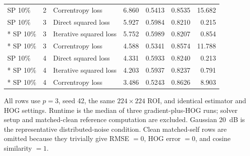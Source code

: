 \begin{longtable}{@{}lr lrrrr@{}}
SP 10\% & 2 & Correntropy loss & 6.860 & 0.5413 & 0.8535 & 15.682 \\
\addlinespace[1.2pt]
SP 10\% & 3 & Direct squared loss & 5.927 & 0.5984 & 0.8210 & 0.215 \\*
SP 10\% & 3 & Iterative squared loss & 5.752 & 0.5989 & 0.8207 & 0.854 \\*
SP 10\% & 3 & Correntropy loss & 4.588 & 0.5341 & 0.8574 & 11.788 \\
\addlinespace[1.2pt]
SP 10\% & 4 & Direct squared loss & 4.331 & 0.5933 & 0.8240 & 0.213 \\*
SP 10\% & 4 & Iterative squared loss & 4.203 & 0.5937 & 0.8237 & 0.791 \\*
SP 10\% & 4 & Correntropy loss & 3.486 & 0.5243 & 0.8626 & 8.903 \\
\end{longtable}
\endgroup
\noindent\footnotesize All rows use $p=3$, seed 42, the same $224\times224$ ROI, and identical estimator and HOG settings. Runtime is the median of three gradient-plus-HOG runs; solver setup and matched-clean reference computation are excluded. Gaussian 20~dB is the representative distributed-noise condition. Clean matched-self rows are omitted because they trivially give RMSE $=0$, HOG error $=0$, and cosine similarity $=1$.
\normalsize
